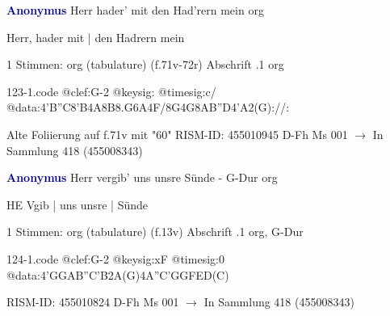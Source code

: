 \documentclass[twocolumn]{book}
\begin{document}
\newline \par \vspace{7pt} \textcolor{darkblue}{\textbf{Anonymus  }}
\newline Herr hader' mit den Had'rern mein
\newline org
\newline \begin{itshape}[f.71v, at left:] Herr, hader mit | den Hadrern mein\end{itshape} 
\newline \textcolor{darkblue}{}  1 Stimmen: org (tabulature)  (f.71v-72r)
\newline Abschrift
.1  org  
\begin{filecontents*}{123-1.code}
@clef:G-2
@keysig:
@timesig:c/
@data:4'B''C8'B4A8B8.G6A4F/8G4G8A{B''D}4'A2(G)://:
\end{filecontents*}
\newline
%
\newline Alte Foliierung auf f.71v mit "60"
\newline RISM-ID: 455010945
\newline D-Fh  Ms 001
\newline $\rightarrow$ In Sammlung 418 (455008343)
      
\newline \par \vspace{7pt} \textcolor{darkblue}{\textbf{Anonymus  }}
\newline Herr vergib' uns unsre Sünde - G-Dur
\newline org
\newline \begin{itshape}[f.13v, at left:] HE Vgib | uns unsre | Sünde\end{itshape} 
\newline \textcolor{darkblue}{}  1 Stimmen: org (tabulature)  (f.13v)
\newline Abschrift
.1  org, G-Dur  
\begin{filecontents*}{124-1.code}
@clef:G-2
@keysig:xF
@timesig:0
@data:4'GGAB''C'B2A(G)4A''C'GGFED(C)
\end{filecontents*}
\newline
%
\newline RISM-ID: 455010824
\newline D-Fh  Ms 001
\newline $\rightarrow$ In Sammlung 418 (455008343)
      
\end{document}

